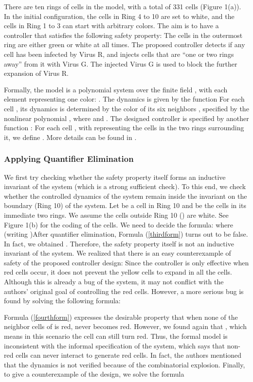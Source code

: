 \documentclass[envcountsect]{llncs}
\begin{document}
{{There are ten rings of cells in the model, with a total of 331 cells (Figure 1(a)). In the initial configuration, the cells in Ring 4 to 10 are set to white, and the cells in Ring 1 to 3 can start with arbitrary colors. The aim is to have a controller that satisfies the following safety property: The cells in the outermost ring are either green or white at all times. The proposed controller detects if any cell has been infected by Virus R, and injects cells that are ``one or two rings away'' from it with Virus G. The injected Virus G is used to block the further expansion of Virus R.

Formally, the model is a polynomial system over the finite field , with each element representing one color: . The dynamics is given by the function  For each cell , its dynamics  is determined by the color of its six neighbors , specified by the nonlinear polynomial , where  and . The designed controller is specified by another function : For each cell , with  representing the cells in the two rings surrounding it, we define . More details can be found in \cite{virus}.

\subsubsection{Applying Quantifier Elimination}
We first try checking whether the safety property itself forms an inductive invariant of the system (which is a strong sufficient check). To this end, we check whether the controlled dynamics of the system remain inside the invariant on the boundary (Ring 10) of the system. Let  be a cell in Ring 10 and  be the cells in its immediate two rings. We assume the cells outside Ring 10 () are white. See Figure 1(b) for the coding of the cells. We need to decide the formula:
{\footnotesize}
where (writing ){\footnotesize}After quantifier elimination, Formula (\ref{thirdform}) turns out to be false. In fact, we obtained . Therefore, the safety property itself is not an inductive invariant of the system. We realized that there is an easy counterexample of safety of the proposed controller design: Since the controller is only effective when red cells occur, it does not prevent the yellow cells to expand in all the cells. Although this is already a bug of the system, it may not conflict with the authors' original goal of controlling the red cells. However, a more serious bug is found by solving the following formula:
{\footnotesize 

}Formula (\ref{fourthform}) expresses the desirable property that when none of the neighbor cells of  is red,  never becomes red. However, we found again that , which means in this scenario the  cell can still turn red. Thus, the formal model is inconsistent with the informal specification of the system, which says that non-red cells can never interact to generate red cells. In fact, the authors mentioned that the dynamics  is not verified because of the combinatorial explosion. Finally, to give a counterexample of the design, we solve the formula
{\footnotesize 

}}}
\end{document}
